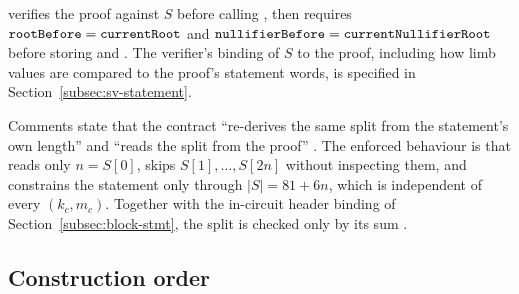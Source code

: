  verifies the proof against $S$ before calling
, then requires $\texttt{rootBefore}=\texttt{currentRoot}$ and
$\texttt{nullifierBefore}=\texttt{currentNullifierRoot}$ before storing
 and .
The verifier's binding of $S$ to the proof, including how limb values are compared
to the proof's statement words, is specified in Section~\ref{subsec:sv-statement}.

\begin{specdelta}
Comments state that the contract ``re-derives the same split from the statement's
own length''  and ``reads the split from
the proof'' . The enforced behaviour
is that  reads only $n=S[0]$, skips $S[1],\dots,S[2n]$ without
inspecting them, and constrains the statement only through $|S| = 81+6n$, which is
independent of every $(k_c,m_c)$.
Together with the in-circuit header binding of Section~\ref{subsec:block-stmt}, the split
is checked only by its sum .
\end{specdelta}

\subsection{Construction order}
\label{subsec:block-order}

